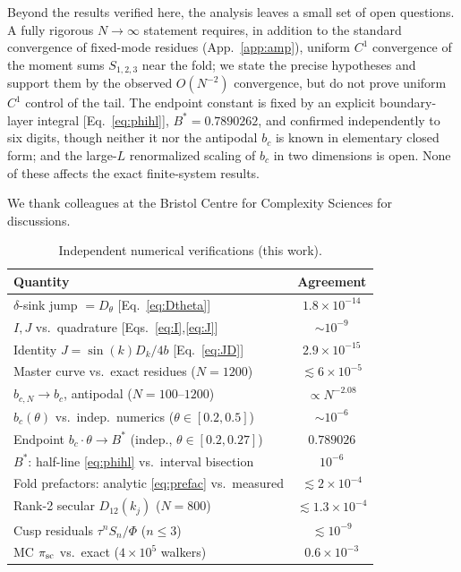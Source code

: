 \documentclass[reprint,amsmath,amssymb,aps,prresearch,longbibliography]{revtex4-2}
\begin{document}
Beyond the results verified here, the analysis leaves a small set of open questions. A fully rigorous
$N\to\infty$ statement requires, in addition to the standard convergence of fixed-mode residues
(App.~\ref{app:amp}), uniform $C^1$ convergence of the moment sums $S_{1,2,3}$ near the fold; we state
the precise hypotheses and support them by the observed $O(N^{-2})$ convergence, but do not prove
uniform $C^1$ control of the tail. The endpoint constant is fixed by an explicit boundary-layer
integral [Eq.~\eqref{eq:phihl}], $B^*=0.7890262$, and confirmed independently to six digits, though
neither it nor the antipodal $b_c$ is known in elementary closed form; and the large-$L$ renormalized
scaling of $b_c$ in two dimensions is open. None of these affects the exact finite-system results.

\begin{acknowledgments}
We thank colleagues at the Bristol Centre for Complexity Sciences for discussions.
\end{acknowledgments}

\appendix

\begin{table}[t]
\caption{\label{tab:verif}Independent numerical verifications (this work).}
\begin{ruledtabular}
\begin{tabular}{lc}
Quantity & Agreement\\
\hline
$\delta$-sink jump $=D_\theta$ [Eq.~\eqref{eq:Dtheta}] & $1.8\times10^{-14}$\\
$I,J$ vs.\ quadrature [Eqs.~\eqref{eq:I},\eqref{eq:J}] & $\sim10^{-9}$\\
Identity $J=\sin(k)D_k/4b$ [Eq.~\eqref{eq:JD}] & $2.9\times10^{-15}$\\
Master curve vs.\ exact residues ($N=1200$) & $\lesssim6\times10^{-5}$\\
$b_{c,N}\to b_c$, antipodal ($N=100$--$1200$) & $\propto N^{-2.08}$\\
$b_c(\theta)$ vs.\ indep.\ numerics ($\theta\in[0.2,0.5]$) & $\sim10^{-6}$\\
Endpoint $b_c\!\cdot\!\theta\to B^*$ (indep., $\theta\in[0.2,0.27]$) & $0.789026$\\
$B^*$: half-line \eqref{eq:phihl} vs.\ interval bisection & $10^{-6}$\\
Fold prefactors: analytic \eqref{eq:prefac} vs.\ measured & $\lesssim2\times10^{-4}$\\
Rank-2 secular $D_{12}(k_j)$ ($N=800$) & $\lesssim1.3\times10^{-4}$\\
Cusp residuals $\tau^n S_n/\Phi$ ($n\le3$) & $\lesssim10^{-9}$\\
MC $\pi_{\rm sc}$ vs.\ exact ($4\times10^5$ walkers) & $0.6\times10^{-3}$\\
\end{tabular}
\end{ruledtabular}
\end{table}
\end{document}
